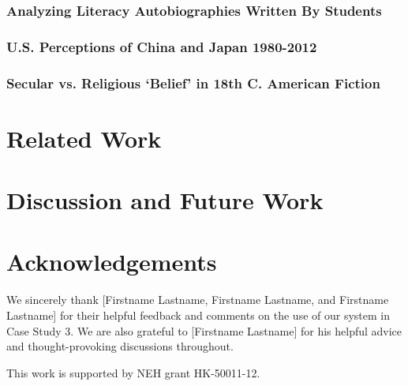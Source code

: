 \documentclass{sig-alternate}
\begin{document}
\subsubsection{Analyzing Literacy Autobiographies Written By Students}

\subsubsection{U.S. Perceptions of China and Japan 1980-2012}

\subsubsection{Secular vs. Religious `Belief'  in 18th C. American Fiction}


\section {Related Work}

\section{Discussion and Future Work}

\section{Acknowledgements}
We sincerely thank [Firstname Lastname, Firstname Lastname, and Firstname Lastname] for their helpful feedback and comments on the use of our system in Case Study 3. We are also grateful to [Firstname Lastname] for his helpful advice and thought-provoking discussions throughout.

This work is supported by NEH grant HK-50011-12.


 
  
\end{document}
